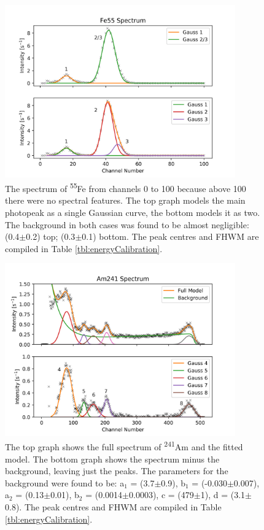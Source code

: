 \begin{figure}[H]
  \centering
  \includegraphics[width=9.93cm]{Fe55_spectrum.png}
  \caption{The spectrum of \textsuperscript{55}Fe from channels 0 to 100 because above 100 there were no spectral features. The top graph models the main photopeak as a single Gaussian curve, the bottom models it as two. The background in both cases was found to be almost negligible: (0.4$\pm$0.2) top; (0.3$\pm$0.1) bottom. The peak centres and FHWM are compiled in Table \ref{tbl:energyCalibration}.}
  \label{fig:Fe55spec}
\end{figure}

\begin{figure}[H]
  \centering
  \includegraphics[width=9.93cm]{Am241_spectrum.png}
  \caption{The top graph shows the full spectrum of \textsuperscript{241}Am and the fitted model. The bottom graph shows the spectrum minus the background, leaving just the peaks. The parameters for the background were found to be: a$_{1}$ = (3.7$\pm$0.9), b$_{1}$ = (-0.030$\pm$0.007), a$_{2}$ = (0.13$\pm$0.01), b$_{2}$ = (0.0014$\pm$0.0003), c = (479$\pm$1), d = (3.1$\pm$0.8). The peak centres and FHWM are compiled in Table \ref{tbl:energyCalibration}.}
  \label{fig:Am241spec}
\end{figure}

